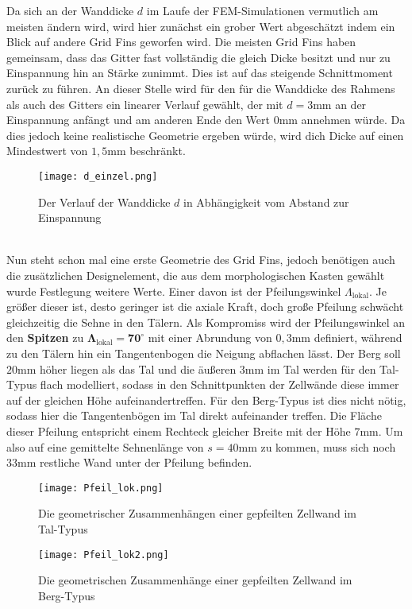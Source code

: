 Da sich an der Wanddicke $d$ im Laufe der FEM-Simulationen vermutlich am meisten ändern wird, wird hier zunächst ein grober Wert abgeschätzt indem ein Blick auf andere Grid Fins geworfen wird. Die meisten Grid Fins haben gemeinsam, dass das Gitter fast vollständig die gleich Dicke besitzt und nur zu Einspannung hin an Stärke zunimmt. Dies ist auf das steigende Schnittmoment zurück zu führen. An dieser Stelle wird für den für die Wanddicke des Rahmens als auch des Gitters ein linearer Verlauf gewählt, der mit $d=3$mm an der Einspannung anfängt und am anderen Ende den Wert $0$mm annehmen würde. Da dies jedoch keine realistische Geometrie ergeben würde, wird dich Dicke auf einen Mindestwert von $1,5$mm beschränkt.
\begin{figure}[h]
	\centering
	\texttt{[image: d\_einzel.png]}
	\caption{Der Verlauf der Wanddicke $d$ in Abhängigkeit vom Abstand zur Einspannung}
	\label{abb_d_einzel}
\end{figure}\\
Nun steht schon mal eine erste Geometrie des Grid Fins, jedoch benötigen auch die zusätzlichen Designelement, die aus dem morphologischen Kasten gewählt wurde Festlegung weitere Werte. Einer davon ist der Pfeilungswinkel $\Lambda_\mathrm{lokal}$. Je größer dieser ist, desto geringer ist die axiale Kraft, doch große Pfeilung schwächt gleichzeitig die Sehne in den Tälern. Als Kompromiss wird der Pfeilungswinkel an den \textbf{Spitzen} zu $\mathbf{\Lambda_\mathrm{lokal}=70^\circ}$ mit einer Abrundung von $0,3$mm definiert, während zu den Tälern hin ein Tangentenbogen die Neigung abflachen lässt. Der Berg soll $20$mm höher liegen als das Tal und die äußeren $3$mm im Tal werden für den Tal-Typus flach modelliert, sodass in den Schnittpunkten der Zellwände diese immer auf der gleichen Höhe aufeinandertreffen. Für den Berg-Typus ist dies nicht nötig, sodass hier die Tangentenbögen im Tal direkt aufeinander treffen. Die Fläche dieser Pfeilung entspricht einem Rechteck gleicher Breite mit der Höhe $7$mm. Um also auf eine gemittelte Sehnenlänge von $s=40$mm zu kommen, muss sich noch $33$mm restliche Wand unter der Pfeilung befinden.
\begin{figure}[h]
	\begin{minipage}[t]{0.45\linewidth}
		\centering
		\texttt{[image: Pfeil\_lok.png]}
		\caption{Die geometrischer Zusammenhängen einer gepfeilten Zellwand im Tal-Typus}
		\label{abb_lok_Tal}
	\end{minipage}
	\hfill
	\begin{minipage}[t]{0.45\linewidth}
		\centering
		\texttt{[image: Pfeil\_lok2.png]}
		\caption{Die geometrischen Zusammenhänge einer gepfeilten Zellwand im Berg-Typus}
		\label{abb_lok_Berg}
	\end{minipage}
\end{figure}\\
